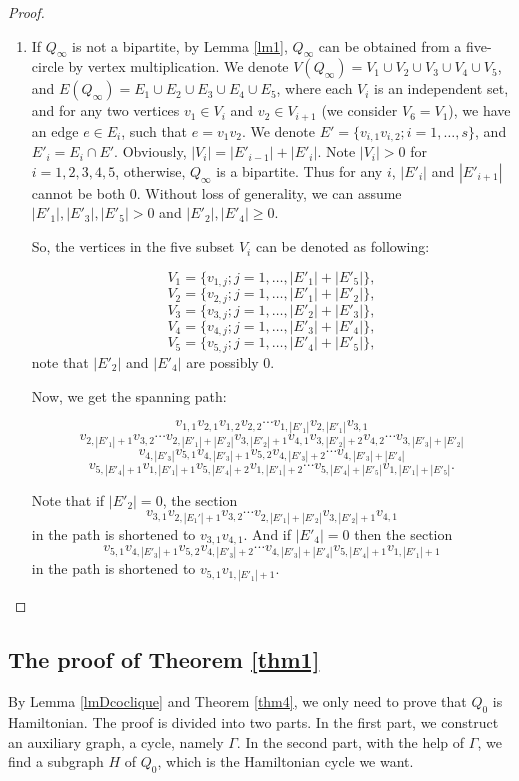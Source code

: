 \documentclass{amsart}
\theoremstyle{definition}
\begin{document}
\begin{proof}
\begin{enumerate}
\item If $Q_{\infty}$ is not a bipartite, by Lemma \ref{lm1}, $Q_{\infty}$ can be obtained from a five-circle by vertex multiplication. We denote $V(Q_{\infty})=V_1\cup V_2\cup V_3\cup V_4\cup V_5$, and $E(Q_{\infty})=E_1\cup E_2\cup E_3\cup E_4\cup E_5$, where each $V_i$ is an independent set, and  for any two vertices $v_1\in V_i$ and $v_2\in V_{i+1}$ (we consider $V_6=V_1$), we have an edge $e\in E_i$, such that $e=v_1v_2$. We denote $E'=\{v_{i,1}v_{i,2};i=1,\ldots,s\}$, and $E'_i=E_i\cap E'$. Obviously, $|V_i|=|E'_{i-1}|+|E'_i|$. Note $|V_i|>0$ for $i=1,2,3,4,5$, otherwise, $Q_{\infty}$ is a bipartite. Thus for any $i$, $|E'_i|$ and $|E'_{i+1}|$ cannot be both 0. Without loss of generality, we can assume $|E'_1|,|E'_3|,|E'_5|>0$ and $|E'_2|,|E'_4|\ge0$.

 So, the vertices in the five subset $V_i$ can be denoted as following:

$$V_1=\{v_{1,j};j=1,\ldots,|E'_1|+|E'_5|\},$$
$$V_2=\{v_{2,j};j=1,\ldots,|E'_1|+|E'_2|\},$$
$$V_3=\{v_{3,j};j=1,\ldots,|E'_2|+|E'_3|\},$$
$$V_4=\{v_{4,j};j=1,\ldots,|E'_3|+|E'_4|\},$$
$$V_5=\{v_{5,j};j=1,\ldots,|E'_4|+|E'_5|\},$$
note that $|E'_2|$ and $|E'_4|$ are possibly 0.

Now, we get the spanning path:

$$v_{1,1}v_{2,1}v_{1,2}v_{2,2}\cdots v_{1,|E'_1|}v_{2,|E'_1|}v_{3,1}$$
$$v_{2,|E'_1|+1}v_{3,2}\cdots v_{2,|E'_1|+|E'_2|}v_{3,|E'_2|+1}v_{4,1}v_{3,|E'_2|+2}v_{4,2}\cdots v_{3,|E'_3|+|E'_2|}$$
$$v_{4,|E'_3|}v_{5,1}v_{4,|E'_3|+1}v_{5,2}v_{4,|E'_3|+2}\cdots v_{4,|E'_3|+|E'_4|}$$
$$v_{5,|E'_4|+1}v_{1,|E'_1|+1}v_{5,|E'_4|+2}v_{1,|E'_1|+2}\cdots v_{5,|E'_4|+|E'_5|}v_{1,|E'_1|+|E'_5|}.$$

Note that if $|E'_2|=0$, the section $$v_{3,1}v_{2,|E_1'|+1}v_{3,2}\cdots v_{2,|E'_1|+|E'_2|}v_{3,|E'_2|+1}v_{4,1}$$ in the path is shortened to $v_{3,1}v_{4,1}$. And if $|E'_4|=0$ then the section $$v_{5,1}v_{4,|E'_3|+1}v_{5,2}v_{4,|E'_3|+2}\cdots v_{4,|E'_3|+|E'_4|}v_{5,|E'_4|+1}v_{1,|E'_1|+1}$$ in the path is shortened to $v_{5,1}v_{1,|E'_1|+1}$.
\end{enumerate}\end{proof}

\subsection{The proof of Theorem \ref{thm1}}
By Lemma \ref{lmDcoclique} and Theorem \ref{thm4}, we only need to prove that $Q_0$ is Hamiltonian.
The proof is divided into two parts. In the first part, we construct an auxiliary graph, a cycle, namely $\Gamma$. In the second part, with the help of $\Gamma$, we find a subgraph $H$ of $Q_0$,  which is the Hamiltonian cycle we want.
\end{document}
